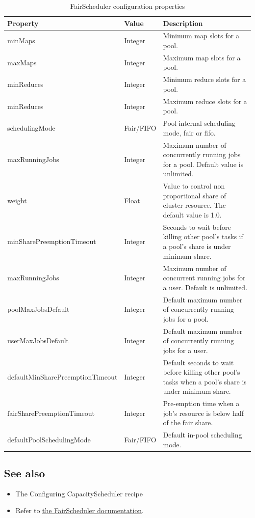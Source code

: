 \begin{table}[h]
  \centering
  \scriptsize
  \begin{tabular}{llp{10cm}}
    \toprule 
    \textbf{Property} & \textbf{Value} & \textbf{Description} \\ \midrule
    minMaps & Integer & Minimum map slots for a pool. \\
    maxMaps & Integer & Maximum map slots for a pool.\\
    minReduces & Integer & Minimum reduce slots for a pool.\\
    minReduces & Integer & Maximum reduce slots for a pool.\\
    schedulingMode & Fair/FIFO & Pool internal scheduling mode, fair or fifo. \\
    maxRunningJobs & Integer & Maximum number of concurrently running jobs for a pool. Default value is unlimited. \\
    weight & Float & Value to control non proportional share of cluster resource. The default value is 1.0. \\
    minSharePreemptionTimeout & Integer & Seconds to wait before killing other pool's tasks if a pool's share is under minimum share. \\
    maxRunningJobs & Integer & Maximum number of concurrent running jobs for a user. Default is unlimited.\\
    poolMaxJobsDefault & Integer & Default maximum number of concurrently running jobs for a pool.\\
    userMaxJobsDefault & Integer & Default maximum number of concurrently running jobs for a user. \\
    defaultMinSharePreemptionTimeout & Integer & Default seconds to wait before killing other pool's tasks when a pool's share is under minimum share. \\
    fairSharePreemptionTimeout & Integer & Pre-emption time when a job's resource is below half of the fair share.\\ \bottomrule
    defaultPoolSchedulingMode & Fair/FIFO & Default in-pool scheduling mode.
  \end{tabular}
  \caption{FairScheduler configuration properties}\label{tbl:fairscheduler}
\end{table}
\subsection*{See also}
\begin{itemize}
\item The Configuring CapacityScheduler recipe
\item Refer to \href{http://hadoop.apache.org/docs/r1.1.2/fair_scheduler.html}{the FairScheduler documentation}.
\end{itemize}

